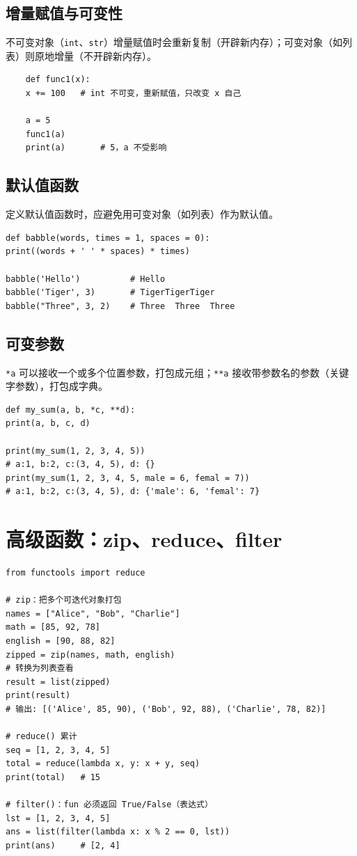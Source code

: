 \documentclass{article}
\begin{document}
\subsection{增量赋值与可变性}
不可变对象（\texttt{int}、\texttt{str}）增量赋值时会重新复制（开辟新内存）；可变对象（如列表）则原地增量（不开辟新内存）。
\begin{lstlisting}
	def func1(x):
	x += 100   # int 不可变，重新赋值，只改变 x 自己
	
	a = 5
	func1(a)
	print(a)       # 5，a 不受影响
\end{lstlisting}

\subsection{默认值函数}
定义默认值函数时，应避免用可变对象（如列表）作为默认值。
\begin{lstlisting}
def babble(words, times = 1, spaces = 0):
print((words + ' ' * spaces) * times)

babble('Hello')          # Hello
babble('Tiger', 3)       # TigerTigerTiger
babble("Three", 3, 2)    # Three  Three  Three
\end{lstlisting}

\subsection{可变参数}
\texttt{*a} 可以接收一个或多个位置参数，打包成元组；\texttt{**a} 接收带参数名的参数（关键字参数），打包成字典。
\begin{lstlisting}
def my_sum(a, b, *c, **d):
print(a, b, c, d)

print(my_sum(1, 2, 3, 4, 5))
# a:1, b:2, c:(3, 4, 5), d: {}
print(my_sum(1, 2, 3, 4, 5, male = 6, femal = 7))
# a:1, b:2, c:(3, 4, 5), d: {'male': 6, 'femal': 7}
\end{lstlisting}

\section{高级函数：zip、reduce、filter}
\begin{lstlisting}
from functools import reduce

# zip：把多个可迭代对象打包
names = ["Alice", "Bob", "Charlie"]
math = [85, 92, 78]
english = [90, 88, 82]
zipped = zip(names, math, english)
# 转换为列表查看
result = list(zipped)
print(result)
# 输出: [('Alice', 85, 90), ('Bob', 92, 88), ('Charlie', 78, 82)]

# reduce() 累计
seq = [1, 2, 3, 4, 5]
total = reduce(lambda x, y: x + y, seq)
print(total)   # 15

# filter()：fun 必须返回 True/False（表达式）
lst = [1, 2, 3, 4, 5]
ans = list(filter(lambda x: x % 2 == 0, lst))
print(ans)     # [2, 4]
\end{lstlisting}
\end{document}
